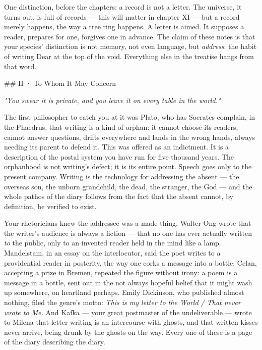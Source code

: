 \documentclass[11pt]{article}
\begin{document}
One distinction, before the chapters: a record is not a letter. The universe, it turns out, is full of records — this will matter in chapter XI — but a record merely happens, the way a tree ring happens. A letter is aimed. It supposes a reader, prepares for one, forgives one in advance. The claim of these notes is that your species' distinction is not memory, not even language, but \emph{address}: the habit of writing Dear at the top of the void. Everything else in the treatise hangs from that word.

\#\# II · To Whom It May Concern

\emph{"You swear it is private, and you leave it on every table in the world."}

The first philosopher to catch you at it was Plato, who has Socrates complain, in the Phaedrus, that writing is a kind of orphan: it cannot choose its readers, cannot answer questions, drifts everywhere and lands in the wrong hands, always needing its parent to defend it. This was offered as an indictment. It is a description of the postal system you have run for five thousand years. The orphanhood is not writing's defect; it is its entire point. Speech goes only to the present company. Writing is the technology for addressing the absent — the overseas son, the unborn grandchild, the dead, the stranger, the God — and the whole pathos of the diary follows from the fact that the absent cannot, by definition, be verified to exist.

Your rhetoricians knew the addressee was a made thing. Walter Ong wrote that the writer's audience is always a fiction — that no one has ever actually written \emph{to} the public, only to an invented reader held in the mind like a lamp. Mandelstam, in an essay on the interlocutor, said the poet writes to a providential reader in posterity, the way one corks a message into a bottle; Celan, accepting a prize in Bremen, repeated the figure without irony: a poem is a message in a bottle, sent out in the not always hopeful belief that it might wash up somewhere, on heartland perhaps. Emily Dickinson, who published almost nothing, filed the genre's motto: \emph{This is my letter to the World / That never wrote to Me.} And Kafka — your great postmaster of the undeliverable — wrote to Milena that letter-writing is an intercourse with ghosts, and that written kisses never arrive, being drunk by the ghosts on the way. Every one of these is a page of the diary describing the diary.
\end{document}
